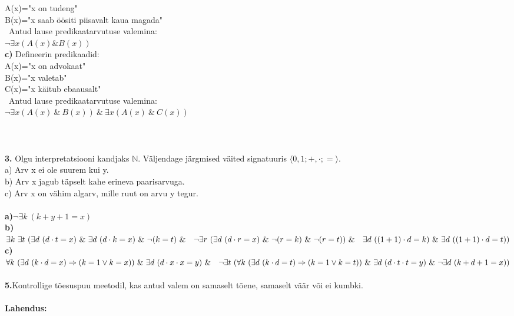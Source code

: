 \documentclass{article}
\begin{document}
\null\quad\quad A(x)="x on tudeng"\\
\null\quad\quad B(x)="x saab öösiti piisavalt kaua magada"\\
\null\quad\ Antud lause predikaatarvutuse valemina:\\
\null\quad\quad $\neg\exists x(A(x)\&B(x))$\\
\textbf{c)} Defineerin predikaadid:\\
\null\quad\quad A(x)="x on advokaat"\\
\null\quad\quad B(x)="x valetab"\\
\null\quad\quad C(x)="x käitub ebaausalt"\\
\null\quad\ Antud lause predikaatarvutuse valemina:\\
\null\quad\quad $\neg\exists x(A(x)\ \&\ B(x))\ \&\ \exists x(A(x)\ \&\ C(x))$\\\\\\\\
\textbf{3.} Olgu interpretatsiooni kandjaks $\mathbb{N}$. Väljendage järgmised väited signatuuris $\langle0,1;+,\cdot;=\rangle$.\\
a) Arv x ei ole suurem kui y.\\
b) Arv x jagub täpselt kahe erineva paarisarvuga.\\
c) Arv x on vähim algarv, mille ruut on arvu y tegur.\\\\
\textbf{a)}$\neg\exists k\ (k+y+1=x)$\\
\textbf{b)}$\exists k\ \exists t\ (\exists d\ (d\cdot t=x)\ \&\ \exists d\ (d\cdot k=x)\ \&\ \neg(k=t)\ \&\\ \null\quad \neg\exists r\ (\exists d\ (d\cdot r=x)\ \&\ \neg(r=k)\ \&\ \neg(r=t))\ \&\\\null\quad \exists d\ ((1+1)\cdot d=k)\ \&\ \exists d\ ((1+1)\cdot d=t))$\\
\textbf{c)}$\forall k\ (\exists d\ (k\cdot d=x)\Rightarrow (k=1\vee k=x))\ \&\ \exists d\ (d\cdot x\cdot x=y)\ \&\\\null\quad \neg\exists t\ (\forall k\ (\exists d\ (k\cdot d=t)\Rightarrow (k=1\vee k=t))\ \&\ \exists d\ (d\cdot t\cdot t=y)\ \&\ \neg\exists d\ (k+d+1=x))$\\\\
\textbf{5.}Kontrollige tõesuspuu meetodil, kas antud valem on samaselt tõene, samaselt väär või ei kumbki.\\\\
\textbf{Lahendus:}\\
\end{document}
